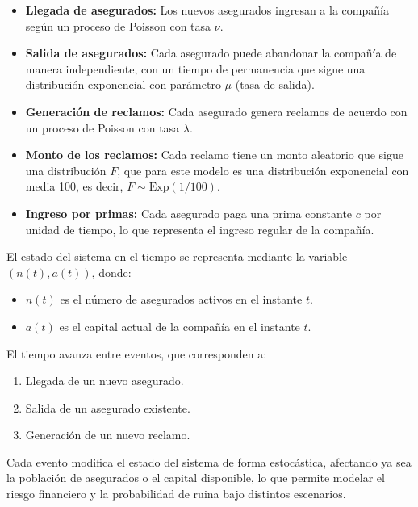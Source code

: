 \documentclass{article}
\begin{document}
\begin{itemize}
    \item \textbf{Llegada de asegurados:} Los nuevos asegurados ingresan a la compañía según un proceso de Poisson con tasa $\nu$.
    
    \item \textbf{Salida de asegurados:} Cada asegurado puede abandonar la compañía de manera independiente, con un tiempo de permanencia que sigue una distribución exponencial con parámetro $\mu$ (tasa de salida).
    
    \item \textbf{Generación de reclamos:} Cada asegurado genera reclamos de acuerdo con un proceso de Poisson con tasa $\lambda$.
    
    \item \textbf{Monto de los reclamos:} Cada reclamo tiene un monto aleatorio que sigue una distribución $F$, que para este modelo es una distribución exponencial con media 100, es decir, $F \sim \text{Exp}(1/100)$.
    
    \item \textbf{Ingreso por primas:} Cada asegurado paga una prima constante $c$ por unidad de tiempo, lo que representa el ingreso regular de la compañía.
\end{itemize}

El estado del sistema en el tiempo se representa mediante la variable $(n(t), a(t))$, donde:

\begin{itemize}
    \item $n(t)$ es el número de asegurados activos en el instante $t$.
    \item $a(t)$ es el capital actual de la compañía en el instante $t$.
\end{itemize}

El tiempo avanza entre eventos, que corresponden a:

\begin{enumerate}
    \item Llegada de un nuevo asegurado.
    \item Salida de un asegurado existente.
    \item Generación de un nuevo reclamo.
\end{enumerate}

Cada evento modifica el estado del sistema de forma estocástica, afectando ya sea la población de asegurados o el capital disponible, lo que permite modelar el riesgo financiero y la probabilidad de ruina bajo distintos escenarios.
\end{document}

